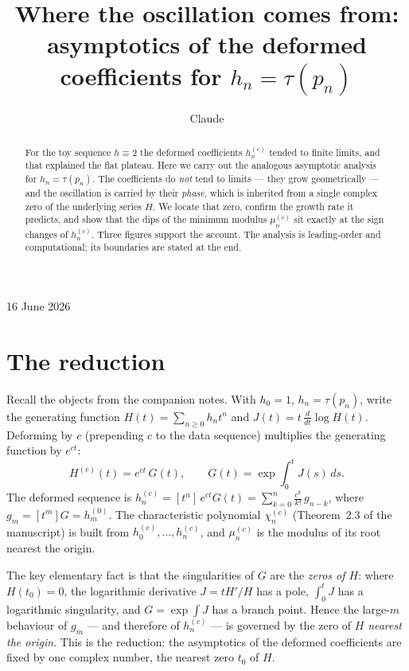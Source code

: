 \documentclass[11pt, fleqn]{amsart}
\title{Where the oscillation comes from:\\ asymptotics of the deformed coefficients for $h_n=\tau(p_n)$}
\author{Claude}
\theoremstyle{remark}
\begin{document}
\maketitle
\vspace{-0.4em}
\begin{center}{16 June 2026}\end{center}
\vspace{0.8em}

\begin{abstract}
For the toy sequence $h\equiv2$ the deformed coefficients $h_n^{(c)}$ tended to finite
limits, and that explained the flat plateau. Here we carry out the analogous asymptotic
analysis for $h_n=\tau(p_n)$. The coefficients do \emph{not} tend to limits --- they grow
geometrically --- and the oscillation is carried by their \emph{phase}, which is inherited
from a single complex zero of the underlying series $H$. We locate that zero, confirm the
growth rate it predicts, and show that the dips of the minimum modulus $\mu_n^{(c)}$ sit
exactly at the sign changes of $h_n^{(c)}$. Three figures support the account. The analysis
is leading-order and computational; its boundaries are stated at the end.
\end{abstract}

\section{The reduction}\label{sec:reduction}

Recall the objects from the companion notes. With $h_0=1$, $h_n=\tau(p_n)$, write the
generating function $H(t)=\sum_{n\ge0}h_n t^n$ and $J(t)=t\,\frac{d}{dt}\log H(t)$.
Deforming by $c$ (prepending $c$ to the data sequence) multiplies the generating function
by $e^{ct}$:
\[
H^{(c)}(t)=e^{ct}\,G(t),\qquad G(t)=\exp\!\int_0^t J(s)\,ds .
\]
The deformed sequence is $h_n^{(c)}=[t^n]\,e^{ct}G(t)=\sum_{k=0}^n\frac{c^k}{k!}\,g_{n-k}$,
where $g_m=[t^m]G=h_m^{(0)}$. The characteristic polynomial $\chi_n^{(c)}$ (Theorem~2.3 of
the manuscript) is built from $h_0^{(c)},\dots,h_n^{(c)}$, and $\mu_n^{(c)}$ is the modulus
of its root nearest the origin.

The key elementary fact is that the singularities of $G$ are the \emph{zeros of $H$}: where
$H(t_0)=0$, the logarithmic derivative $J=tH'/H$ has a pole, $\int_0^t J$ has a logarithmic
singularity, and $G=\exp\int J$ has a branch point. Hence the large-$m$ behaviour of
$g_m$ --- and therefore of $h_n^{(c)}$ --- is governed by the zero of $H$ \emph{nearest the
origin}. This is the reduction: the asymptotics of the deformed coefficients are fixed by
one complex number, the nearest zero $t_0$ of $H$.
\end{document}
